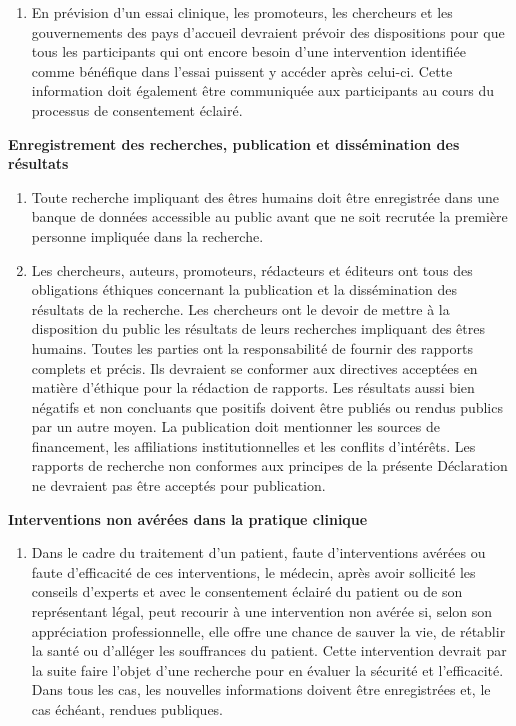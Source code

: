 \documentclass[
  12pt,
]{book}
\providecommand{\tightlist}{%
  \setlength{\itemsep}{0pt}\setlength{\parskip}{0pt}}
\begin{document}
\begin{enumerate}
\def\labelenumi{\arabic{enumi}.}
\setcounter{enumi}{33}
\tightlist
\item
  En prévision d'un essai clinique, les promoteurs, les chercheurs et les gouvernements des pays d'accueil devraient prévoir des dispositions pour que tous les participants qui ont encore besoin d'une intervention identifiée comme bénéfique dans l'essai puissent y accéder après celui-ci. Cette information doit également être communiquée aux participants au cours du processus de consentement éclairé.
\end{enumerate}

\textbf{Enregistrement des recherches, publication et dissémination des résultats}

\begin{enumerate}
\def\labelenumi{\arabic{enumi}.}
\setcounter{enumi}{34}
\item
  Toute recherche impliquant des êtres humains doit être enregistrée dans une banque de données accessible au public avant que ne soit recrutée la première personne impliquée dans la recherche.
\item
  Les chercheurs, auteurs, promoteurs, rédacteurs et éditeurs ont tous des obligations éthiques concernant la publication et la dissémination des résultats de la recherche. Les chercheurs ont le devoir de mettre à la disposition du public les résultats de leurs recherches impliquant des êtres humains. Toutes les parties ont la responsabilité de fournir des rapports complets et précis. Ils devraient se conformer aux directives acceptées en matière d'éthique pour la rédaction de rapports. Les résultats aussi bien négatifs et non concluants que positifs doivent être publiés ou rendus publics par un autre moyen. La publication doit mentionner les sources de financement, les affiliations institutionnelles et les conflits d'intérêts. Les rapports de recherche non conformes aux principes de la présente Déclaration ne devraient pas être acceptés pour publication.
\end{enumerate}

\textbf{Interventions non avérées dans la pratique clinique}

\begin{enumerate}
\def\labelenumi{\arabic{enumi}.}
\setcounter{enumi}{36}
\tightlist
\item
  Dans le cadre du traitement d'un patient, faute d'interventions avérées ou faute d'efficacité de ces interventions, le médecin, après avoir sollicité les conseils d'experts et avec le consentement éclairé du patient ou de son représentant légal, peut recourir à une intervention non avérée si, selon son appréciation professionnelle, elle offre une chance de sauver la vie, de rétablir la santé ou d'alléger les souffrances du patient. Cette intervention devrait par la suite faire l'objet d'une recherche pour en évaluer la sécurité et l'efficacité. Dans tous les cas, les nouvelles informations doivent être enregistrées et, le cas échéant, rendues publiques.
\end{enumerate}
\end{document}
